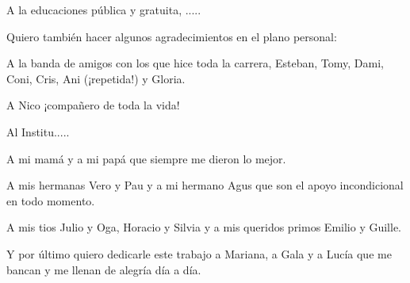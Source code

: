 A la educaciones pública y gratuita, ..... \bigskip


Quiero también hacer algunos agradecimientos en el plano personal: 

A la banda de amigos con los que hice toda la carrera, Esteban, Tomy, Dami, Coni, Cris, Ani (¡repetida!) y Gloria.\bigskip

A Nico ¡compañero de toda la vida! \bigskip

Al Institu.....\bigskip 

A mi mamá y a mi papá que siempre me dieron lo mejor.\bigskip

A mis hermanas Vero y Pau y a mi hermano Agus que son el apoyo incondicional en todo momento. \bigskip

A mis tios Julio y Oga, Horacio y Silvia y a mis queridos primos Emilio y Guille.\bigskip

Y por último quiero dedicarle este trabajo a Mariana, a Gala y a Lucía que me bancan y me llenan de alegría día a día.














\cleardoublepage